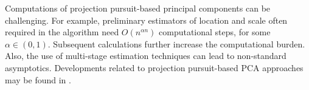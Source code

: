 \documentclass[ss]{imsart}
\theoremstyle{Example}
\begin{document}
Computations of projection pursuit-based principal components can be challenging. For example, preliminary estimators of location and scale often required in the algorithm need $O (n^{\alpha n})$ computational steps, for some 
$\alpha \in (0, 1)$. Subsequent calculations further increase the computational burden. Also, the use of multi-stage estimation techniques can lead to non-standard asymptotics. 
Developments related to projection pursuit-based PCA approaches may be found in 
\cite{ref:JASA93505_PCA, ref:AISM98471_PCA, ref:SPL99349_PCA, ref:Biometrika03953_Cuietal_RPCA, ref:IJCV03117_RPCA, ref:Technometrics0564_Hubert_RPCA, ref:Technometrics05264_Maronna_RCPA, ref:JMVA05206_RPCA_Croux, ref:CSDA061441_RPCA, croux2007algorithms, ref:IEEETransPAMI081672_RPCA, ref:Technometrics13202_Croux_PCA, ref:Biometrika15573_PCA}.
\end{document}
